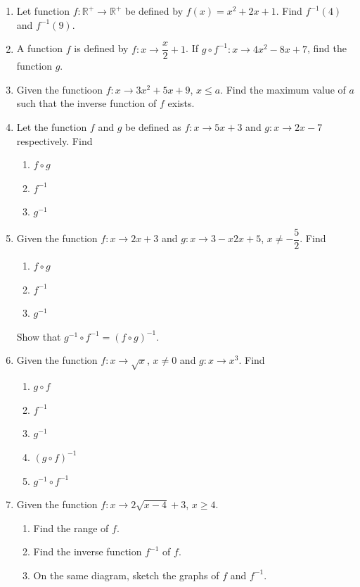 \documentclass[12pt]{report}
\begin{document}
\begin{multicols}{2}
\begin{enumerate}
    \item Let function $f: \mathbb{R}^+ \to \mathbb{R}^+$ be defined by $f(x) = x^2 + 2x
            + 1$. Find $f^{-1}(4)$ and $f^{-1}(9)$.

    \item A function $f$ is defined by $f:x \to \dfrac{x}{2} + 1$. If $g \circ f^{-1}: x
            \to 4x^2 - 8x + 7$, find the function $g$.

    \item Given the functioon $f:x \to 3x^2 + 5x + 9$, $x \leq a$. Find the maximum value
          of $a$ such that the inverse function of $f$ exists.

    \item Let the function $f$ and $g$ be defined as $f:x \to 5x + 3$ and $g:x \to 2x -
            7$ respectively. Find
          \begin{enumerate}
            \item $f \circ g$
            \item $f^{-1}$
            \item $g^{-1}$
          \end{enumerate}

    \item Given the function $f:x \to 2x + 3$ and $g:x \to {3-x}{2x + 5}$, $x \neq
            -\dfrac{5}{2}$. Find
          \begin{enumerate}
            \item $f \circ g$
            \item $f^{-1}$
            \item $g^{-1}$
          \end{enumerate}
          Show that $g^{-1} \circ f^{-1} = (f \circ g)^{-1}$.

    \item Given the function $f:x \to \sqrt{x}$, $x \neq 0$ and $g:x \to x^3$. Find
          \begin{enumerate}
            \item $g \circ f$
            \item $f^{-1}$
            \item $g^{-1}$
            \item $(g \circ f)^{-1}$
            \item $g^{-1} \circ f^{-1}$
          \end{enumerate}

    \item Given the function $f:x \to 2\sqrt{x-4} + 3$, $x \geq 4$.
          \begin{enumerate}
            \item Find the range of $f$.
            \item Find the inverse function $f^{-1}$ of $f$.
            \item On the same diagram, sketch the graphs of $f$ and $f^{-1}$.
          \end{enumerate}

  \end{enumerate}
\end{multicols}
\end{document}
